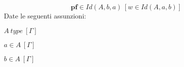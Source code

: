 \begin{displaymath}
    \textbf{pf} \in Id(A, b, a)\ [w \in Id(A, a, b)]
\end{displaymath}
Date le seguenti assunzioni:
\begin{enumerate*}[label=$\pi_{\arabic*}$)]
    \item $A\ type\ [\Gamma]$
    \item $a \in A\ [\Gamma]$
    \item $b \in A\ [\Gamma]$
\end{enumerate*}